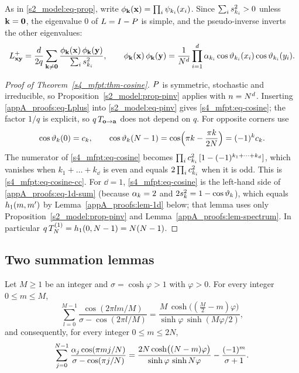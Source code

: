 As in \eqref{s2_model:eq-prop}, write $\phi_{\mathbf{k}}(\mathbf{x})=\prod_i\psi_{k_i}(x_i)$. Since $\sum_is_{k_i}^{2}>0$ unless $\mathbf{k}=\mathbf 0$, the eigenvalue
$0$ of $L=I-P$ is simple, and the pseudo-inverse inverts the other eigenvalues:
\begin{equation}\label{appA_proofs:eq-Lplus}
  L^{+}_{\mathbf{x}\mathbf{y}}=\frac{d}{2q}\sum_{\mathbf{k}\ne\mathbf 0}\frac{\phi_{\mathbf{k}}(\mathbf{x})\,\phi_{\mathbf{k}}(\mathbf{y})}{\sum_{i}s_{k_i}^{2}},\qquad
  \phi_{\mathbf{k}}(\mathbf{x})\,\phi_{\mathbf{k}}(\mathbf{y})=\frac{1}{N^{d}}\prod_{i=1}^{d}\alpha_{k_i}\cos\vartheta_{k_i}(x_i)\cos\vartheta_{k_i}(y_i).
\end{equation}

\begin{proof}[Proof of Theorem~\ref{s4_mfpt:thm-cosine}]
$P$ is symmetric, stochastic and irreducible, so Proposition~\ref{s2_model:prop-pinv} applies with $n=N^{d}$.
Inserting \eqref{appA_proofs:eq-Lplus} into \eqref{s2_model:eq-pinv} gives \eqref{s4_mfpt:eq-cosine}; the factor
$1/q$ is explicit, so $q\,T_{\mathbf{o}\to\mathbf{a}}$ does not depend on $q$. For opposite corners use
\begin{equation}\label{appA_proofs:eq-corner-cos}
  \cos\vartheta_{k}(0)=c_{k},\qquad \cos\vartheta_{k}(N-1)=\cos\Bigl(\pi k-\frac{\pi k}{2N}\Bigr)=(-1)^{k}c_{k}.
\end{equation}
The numerator of \eqref{s4_mfpt:eq-cosine} becomes $\prod_ic_{k_i}^{2}\,[1-(-1)^{k_1+\dots+k_{d}}]$, which
vanishes when $k_1+\dots+k_{\dd}$ is even and equals $2\prod_ic_{k_i}^{2}$ when it is odd. This is
\eqref{s4_mfpt:eq-cosine-cc}. For $\dd=1$, \eqref{s4_mfpt:eq-cosine} is the left-hand side of
\eqref{appA_proofs:eq-1d-sum} (because $\alpha_{k}=2$ and $2s_{k}^{2}=1-\cos\vartheta_{k}$), which equals $h_{1}(m,m')$ by
Lemma~\ref{appA_proofs:lem-1d} below; that lemma uses only Proposition~\ref{s2_model:prop-pinv} and
Lemma~\ref{appA_proofs:lem-spectrum}. In particular $q\,T_{N}^{(1)}=h_{1}(0,N-1)=N(N-1)$.
\end{proof}

\subsection{Two summation lemmas}

\begin{lemma}\label{appA_proofs:lem-ring}
Let $M\ge1$ be an integer and $\sigma=\cosh\varphi>1$ with $\varphi>0$.  For every integer $0\le m\le M$,
\begin{equation}\label{appA_proofs:eq-ring}
  \sum_{l=0}^{M-1}\frac{\cos(2\pi lm/M)}{\sigma-\cos(2\pi l/M)}=\frac{M\,\cosh\bigl((\tfrac M2-m)\varphi\bigr)}{\sinh\varphi\,\sinh(M\varphi/2)} ,
\end{equation}
and consequently, for every integer $0\le m\le 2N$,
\begin{equation}\label{appA_proofs:eq-ring-half}
  \sum_{j=0}^{N-1}\frac{\alpha_{j}\cos(\pi m j/N)}{\sigma-\cos(\pi j/N)}=\frac{2N\cosh\bigl((N-m)\varphi\bigr)}{\sinh\varphi\,\sinh N\varphi}-\frac{(-1)^{m}}{\sigma+1}.
\end{equation}
\end{lemma}

